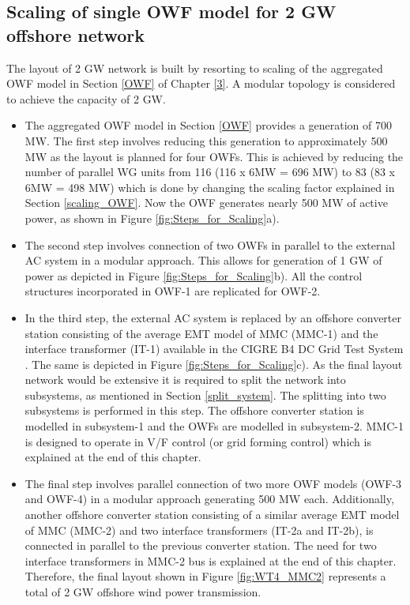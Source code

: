 \subsection{Scaling of single \gls{OWF} model for 2 GW offshore network}\label{scaling_2GW}

The layout of 2 GW network is built by resorting to scaling of the aggregated \gls{OWF} model in Section \ref{OWF} of Chapter \ref{3}. A modular topology is considered to achieve the capacity of 2 GW. 

\begin{itemize}
    \item The aggregated \gls{OWF} model in Section \ref{OWF} provides a generation of 700 MW. The first step involves reducing this generation to approximately 500 MW as the layout is planned for four \gls{OWF}s. This is achieved by reducing the number of parallel \gls{WG} units from 116 (116 x 6MW = 696 MW) to 83 (83 x 6MW = 498 MW) which is done by changing the scaling factor explained in Section \ref{scaling_OWF}. Now the \gls{OWF} generates nearly 500 MW of active power, as shown in Figure \ref{fig:Steps_for_Scaling}a).
    \item The second step involves connection of two \gls{OWF}s in parallel to the external \gls{AC} system in a modular approach. This allows for generation of 1 GW of power as depicted in Figure \ref{fig:Steps_for_Scaling}b). All the control structures incorporated in \gls{OWF}-1 are replicated for \gls{OWF}-2.
    \item In the third step, the external \gls{AC} system is replaced by an offshore converter station consisting of the average \gls{EMT} model of \gls{MMC} (\gls{MMC}-1) and the interface transformer (IT-1) available in the CIGRE B4 DC Grid Test System \cite{vrana2013cigre}. The same is depicted in Figure \ref{fig:Steps_for_Scaling}c). As the final layout network would be extensive it is required to split the network into subsystems, as mentioned in Section  \ref{split_system}. The splitting into two subsystems is performed in this step. The offshore converter station is modelled in subsystem-1 and the \gls{OWF}s are modelled in subsystem-2. \gls{MMC}-1 is designed to operate in V/F control (or grid forming control) which is explained at the end of this chapter.
    \item The final step involves parallel connection of two more \gls{OWF} models (\gls{OWF}-3 and \gls{OWF}-4) in a modular approach generating 500 MW each. Additionally, another offshore converter station consisting of a similar average \gls{EMT} model of \gls{MMC} (\gls{MMC}-2) and two interface transformers (IT-2a and IT-2b), is connected in parallel to the previous converter station. The need for two interface transformers in \gls{MMC}-2 bus is explained at the end of this chapter. Therefore, the final layout shown in Figure \ref{fig:WT4_MMC2} represents a total of 2 GW offshore wind power transmission.
\end{itemize}


